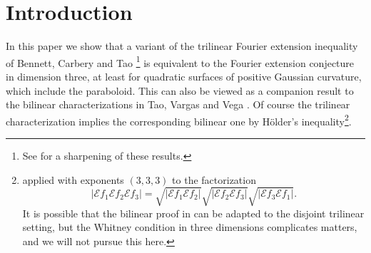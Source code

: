 \documentclass{amsart}%
\theoremstyle{plain}
\numberwithin{equation}{section}
\begin{document}
\begin{abstract}
Then we prove the equivalence of the above trilinear Fourier extension
conjecture with the special case of testing a local trilinear inequality over
certain smooth Alpert pseudoprojections $\mathsf{Q}_{s,U}^{\eta}f$,
representing the weakest such inequality equivalent to the Fourier extension
conjecture that the authors could find. This special inequality has the
following form. For every $q>3$ there is $\nu>0$ such that
\begin{align*}
&  \left(  \int_{B\left(  0,2^{s}\right)  \setminus B\left(  0,2^{s-1}\right)
}\left(  \left\vert \mathcal{E}\mathsf{Q}_{s_{1},U_{1}}^{\eta}f_{1}\left(
\xi\right)  \right\vert \ \left\vert \mathcal{E}\mathsf{Q}_{s_{2},U_{2}}%
^{\eta}f_{2}\left(  \xi\right)  \right\vert \ \left\vert \mathcal{E}%
\mathsf{Q}_{s_{3},U_{3}}^{\eta}f_{3}\left(  \xi\right)  \right\vert \right)
^{\frac{q}{3}}\ d\xi\right)  ^{\frac{3}{q}}\\
&  \ \ \ \ \ \ \ \ \ \ \ \ \ \ \ \ \ \ \ \ \lesssim2^{\varepsilon s}\left\Vert
f_{1}\right\Vert _{L^{\infty}}\left\Vert f_{2}\right\Vert _{L^{\infty}%
}\left\Vert f_{3}\right\Vert _{L^{\infty}}\ ,
\end{align*}
for all $\nu$-disjoint triples $\left(  U_{1},U_{2},U_{3}\right)  $, all
$\varepsilon>0$, $s\in\mathbb{N}$ and $s_{1}\leq s_{2}\leq s_{3}$ with
$s_{2},s_{3}$ arbitrarily close to $s$.

The extension to other quadratic surfaces of positive Gaussian curvature in
$\mathbb{R}^{3}$ is straightforward.

\end{abstract}
\tableofcontents


\section{Introduction}

In this paper we show that a variant of the trilinear Fourier extension
inequality of Bennett, Carbery and Tao \cite{BeCaTa}\footnote{See \cite{Tao2}
for a sharpening of these results.} is equivalent to the Fourier extension
conjecture in dimension three, at least for quadratic surfaces of positive
Gaussian curvature, which include the paraboloid. This can also be viewed as a
companion result to the bilinear characterizations in Tao, Vargas and Vega
\cite{TaVaVe}. Of course the trilinear characterization implies the
corresponding bilinear one by H\"{o}lder's inequality\footnote{applied with
exponents $\left(  3,3,3\right)  $ to the factorization%
\[
\left\vert \mathcal{E}f_{1}\mathcal{E}f_{2}\mathcal{E}f_{3}\right\vert
=\sqrt{\left\vert \mathcal{E}f_{1}\mathcal{E}f_{2}\right\vert }\sqrt
{\left\vert \mathcal{E}f_{2}\mathcal{E}f_{3}\right\vert }\sqrt{\left\vert
\mathcal{E}f_{3}\mathcal{E}f_{1}\right\vert }.
\]
It is possible that the bilinear proof in \cite{TaVaVe} can be adapted to the
disjoint trilinear setting, but the Whitney condition in three dimensions
complicates matters, and we will not pursue this here.}.
\end{document}
